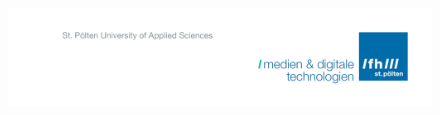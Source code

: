 


\pagestyle{empty}

\begin{figure}[H]
\vspace*{-2.5cm}
\hspace*{2.5cm}
\includegraphics[keepaspectratio, width=1.4\textwidth, right]{TemplateElements/fhLogo3.png}
\end{figure}


